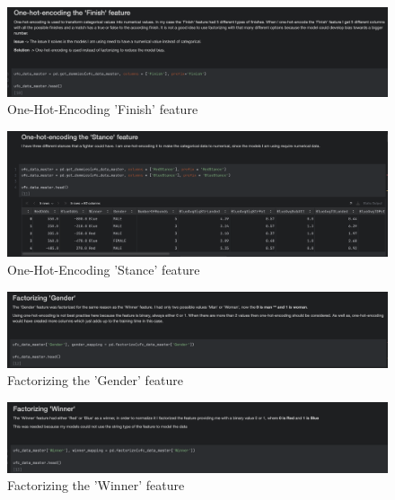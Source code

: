 \documentclass{article}
\begin{document}
\begin{figure}[H]
	\centering
	\includegraphics[width=1\textwidth]{images/One_hot_encoding_finish.png}
	\caption{One-Hot-Encoding 'Finish' feature}
	\label{fig:One_hot_encoding_finish}
\end{figure}

\begin{figure}[H]
	\centering
	\includegraphics[width=1\textwidth]{images/One_hot_encodiong_Stance.png}
	\caption{One-Hot-Encoding 'Stance' feature}
	\label{fig:One_hot_encoding_stance}
\end{figure}

\begin{figure}[H]
	\centering
	\includegraphics[width=1\textwidth]{images/Factorizing_Gender.png}
	\caption{Factorizing the 'Gender' feature}
	\label{fig:factorizing_gender}
\end{figure}

\begin{figure}[H]
	\centering
	\includegraphics[width=1\textwidth]{images/Factorizing_Winner.png}
	\caption{Factorizing the 'Winner' feature}
	\label{fig:factorizing_winner}
\end{figure}
\end{document}
